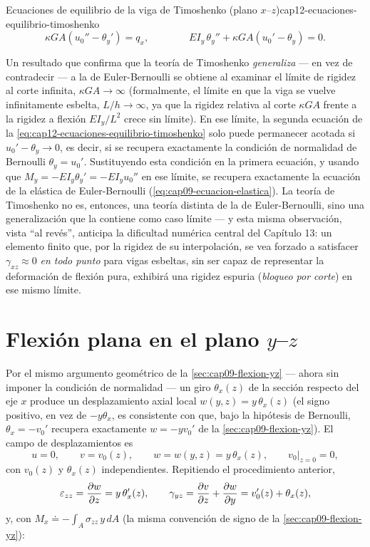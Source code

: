 \begin{ecnimportante}{Ecuaciones de equilibrio de la viga de Timoshenko (plano \texorpdfstring{$x$--$z$}{x-z})}{cap12-ecuaciones-equilibrio-timoshenko}
\[
\kappa GA\left(u_0''-\theta_y'\right) = q_x , \qquad\qquad
EI_y\,\theta_y'' + \kappa GA\left(u_0'-\theta_y\right) = 0 .
\]
\end{ecnimportante}

\begin{observacion}
Un resultado que confirma que la teoría de Timoshenko \emph{generaliza} --- en vez de contradecir --- a la de Euler-Bernoulli se obtiene al examinar el límite de rigidez al corte infinita, $\kappa GA\to\infty$ (formalmente, el límite en que la viga se vuelve infinitamente esbelta, $L/h\to\infty$, ya que la rigidez relativa al corte $\kappa GA$ frente a la rigidez a flexión $EI_y/L^2$ crece sin límite). En ese límite, la segunda ecuación de la \cref{eq:cap12-ecuaciones-equilibrio-timoshenko} solo puede permanecer acotada si $u_0'-\theta_y\to0$, es decir, si se recupera exactamente la condición de normalidad de Bernoulli $\theta_y=u_0'$. Sustituyendo esta condición en la primera ecuación, y usando que $M_y=-EI_y\theta_y'=-EI_yu_0''$ en ese límite, se recupera exactamente la ecuación de la elástica de Euler-Bernoulli (\cref{eq:cap09-ecuacion-elastica}). La teoría de Timoshenko no es, entonces, una teoría distinta de la de Euler-Bernoulli, sino una generalización que la contiene como caso límite --- y esta misma observación, vista ``al revés'', anticipa la dificultad numérica central del Capítulo 13: un elemento finito que, por la rigidez de su interpolación, se vea forzado a satisfacer $\gamma_{xz}\approx0$ \emph{en todo punto} para vigas esbeltas, sin ser capaz de representar la deformación de flexión pura, exhibirá una rigidez espuria (\emph{bloqueo por corte}) en ese mismo límite.
\end{observacion}

\section{Flexión plana en el plano \texorpdfstring{$y$--$z$}{y-z}}
\label{sec:cap12-flexion-yz}

Por el mismo argumento geométrico de la \cref{sec:cap09-flexion-yz} --- ahora sin imponer la condición de normalidad --- un giro $\theta_x(z)$ de la sección respecto del eje $x$ produce un desplazamiento axial local $w(y,z)=y\,\theta_x(z)$ (el signo positivo, en vez de $-y\theta_x$, es consistente con que, bajo la hipótesis de Bernoulli, $\theta_x=-v_0'$ recupera exactamente $w=-yv_0'$ de la \cref{sec:cap09-flexion-yz}). El campo de desplazamientos es
\[
u=0, \qquad v=v_0(z), \qquad w=w(y,z)=y\,\theta_x(z) , \qquad v_0\big|_{z=0}=0 ,
\]
con $v_0(z)$ y $\theta_x(z)$ independientes. Repitiendo el procedimiento anterior,
\[
\varepsilon_{zz}=\pdv{w}{z}=y\,\theta_x'(z), \qquad
\gamma_{yz}=\pdv{v}{z}+\pdv{w}{y}=v_0'(z)+\theta_x(z) ,
\]
y, con $M_x\doteq-\int_A\sigma_{zz}\,y\,dA$ (la misma convención de signo de la \cref{sec:cap09-flexion-yz}):

